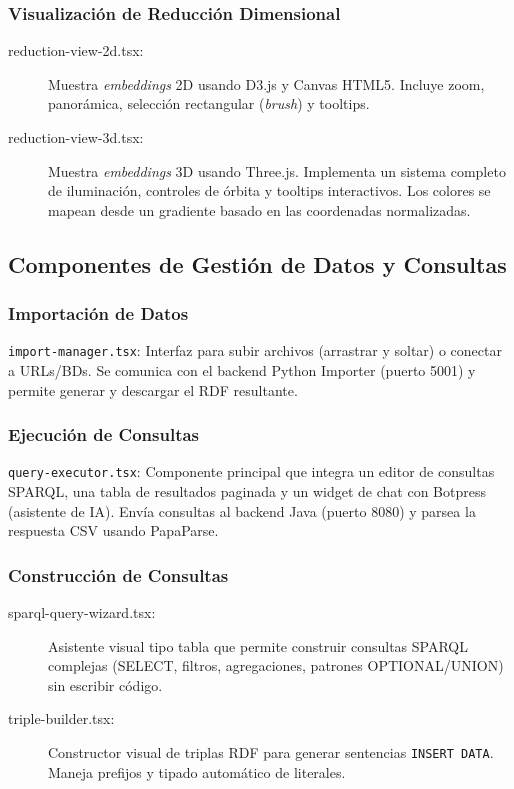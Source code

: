 \documentclass{article}
\begin{document}
\subsubsection{Visualización de Reducción Dimensional}
\begin{description}
    \item[reduction-view-2d.tsx:] Muestra \textit{embeddings} 2D usando D3.js y Canvas HTML5. Incluye zoom, panorámica, selección rectangular (\textit{brush}) y tooltips.
    \item[reduction-view-3d.tsx:] Muestra \textit{embeddings} 3D usando Three.js. Implementa un sistema completo de iluminación, controles de órbita y tooltips interactivos. Los colores se mapean desde un gradiente basado en las coordenadas normalizadas.
\end{description}

\subsection{Componentes de Gestión de Datos y Consultas}

\subsubsection{Importación de Datos}
\texttt{import-manager.tsx}: Interfaz para subir archivos (arrastrar y soltar) o conectar a URLs/BDs. Se comunica con el backend Python Importer (puerto 5001) y permite generar y descargar el RDF resultante.

\subsubsection{Ejecución de Consultas}
\texttt{query-executor.tsx}: Componente principal que integra un editor de consultas SPARQL, una tabla de resultados paginada y un widget de chat con Botpress (asistente de IA). Envía consultas al backend Java (puerto 8080) y parsea la respuesta CSV usando PapaParse.

\subsubsection{Construcción de Consultas}
\begin{description}
    \item[sparql-query-wizard.tsx:] Asistente visual tipo tabla que permite construir consultas SPARQL complejas (SELECT, filtros, agregaciones, patrones OPTIONAL/UNION) sin escribir código.
    \item[triple-builder.tsx:] Constructor visual de triplas RDF para generar sentencias \texttt{INSERT DATA}. Maneja prefijos y tipado automático de literales.
\end{description}
\end{document}
